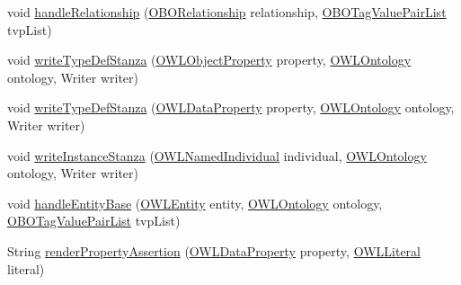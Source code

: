 \begin{DoxyCompactItemize}
\item 
void \hyperlink{classorg_1_1coode_1_1owlapi_1_1obo_1_1renderer_1_1_o_b_o_flat_file_renderer_af0f3d65df9282d26e099956513aba23f}{handle\-Relationship} (\hyperlink{classorg_1_1coode_1_1owlapi_1_1obo_1_1renderer_1_1_o_b_o_relationship}{O\-B\-O\-Relationship} relationship, \hyperlink{classorg_1_1coode_1_1owlapi_1_1obo_1_1renderer_1_1_o_b_o_tag_value_pair_list}{O\-B\-O\-Tag\-Value\-Pair\-List} tvp\-List)
\item 
void \hyperlink{classorg_1_1coode_1_1owlapi_1_1obo_1_1renderer_1_1_o_b_o_flat_file_renderer_a9d61f2bbfc8099f93a6ed770cd4751d9}{write\-Type\-Def\-Stanza} (\hyperlink{interfaceorg_1_1semanticweb_1_1owlapi_1_1model_1_1_o_w_l_object_property}{O\-W\-L\-Object\-Property} property, \hyperlink{interfaceorg_1_1semanticweb_1_1owlapi_1_1model_1_1_o_w_l_ontology}{O\-W\-L\-Ontology} ontology, Writer writer)
\item 
void \hyperlink{classorg_1_1coode_1_1owlapi_1_1obo_1_1renderer_1_1_o_b_o_flat_file_renderer_a2836f83c92fdbfd49c82203303d8e634}{write\-Type\-Def\-Stanza} (\hyperlink{interfaceorg_1_1semanticweb_1_1owlapi_1_1model_1_1_o_w_l_data_property}{O\-W\-L\-Data\-Property} property, \hyperlink{interfaceorg_1_1semanticweb_1_1owlapi_1_1model_1_1_o_w_l_ontology}{O\-W\-L\-Ontology} ontology, Writer writer)
\item 
void \hyperlink{classorg_1_1coode_1_1owlapi_1_1obo_1_1renderer_1_1_o_b_o_flat_file_renderer_a4b19ef2f9e5e326c18bac99e2d1f5f6d}{write\-Instance\-Stanza} (\hyperlink{interfaceorg_1_1semanticweb_1_1owlapi_1_1model_1_1_o_w_l_named_individual}{O\-W\-L\-Named\-Individual} individual, \hyperlink{interfaceorg_1_1semanticweb_1_1owlapi_1_1model_1_1_o_w_l_ontology}{O\-W\-L\-Ontology} ontology, Writer writer)
\item 
void \hyperlink{classorg_1_1coode_1_1owlapi_1_1obo_1_1renderer_1_1_o_b_o_flat_file_renderer_a529ea3fac36b44fc6ff923341e9a6853}{handle\-Entity\-Base} (\hyperlink{interfaceorg_1_1semanticweb_1_1owlapi_1_1model_1_1_o_w_l_entity}{O\-W\-L\-Entity} entity, \hyperlink{interfaceorg_1_1semanticweb_1_1owlapi_1_1model_1_1_o_w_l_ontology}{O\-W\-L\-Ontology} ontology, \hyperlink{classorg_1_1coode_1_1owlapi_1_1obo_1_1renderer_1_1_o_b_o_tag_value_pair_list}{O\-B\-O\-Tag\-Value\-Pair\-List} tvp\-List)
\item 
String \hyperlink{classorg_1_1coode_1_1owlapi_1_1obo_1_1renderer_1_1_o_b_o_flat_file_renderer_a31d3cad315af40c83aeed3679e1fca32}{render\-Property\-Assertion} (\hyperlink{interfaceorg_1_1semanticweb_1_1owlapi_1_1model_1_1_o_w_l_data_property}{O\-W\-L\-Data\-Property} property, \hyperlink{interfaceorg_1_1semanticweb_1_1owlapi_1_1model_1_1_o_w_l_literal}{O\-W\-L\-Literal} literal)

\end{DoxyCompactItemize}
